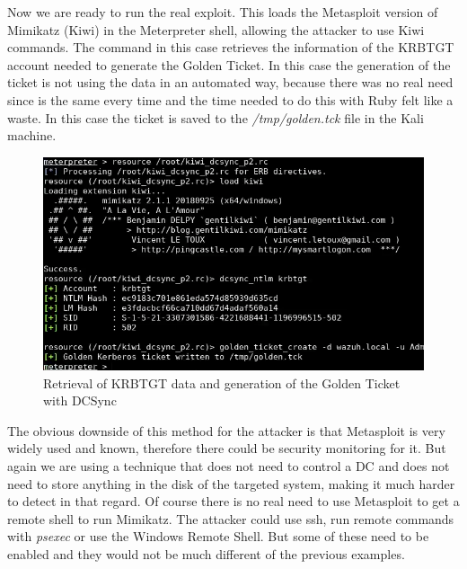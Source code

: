 Now we are ready to run the real exploit. This loads the Metasploit version of Mimikatz (Kiwi) in the Meterpreter shell, allowing the attacker to use Kiwi commands.
The command in this case retrieves the information of the KRBTGT account needed to generate the Golden Ticket.
\linej
In this case the generation of the ticket is not using the data in an automated way, because there was no real need since is the same every time and the time needed to do this with Ruby felt like a waste. In this case the ticket is saved to the \textit{/tmp/golden.tck} file in the Kali machine.
\linej

\begin{figure}[H]
	\centering
	\includegraphics[width=\textwidth]{figuras/kiwi_p2.png}
	\caption{Retrieval of KRBTGT data and generation of the Golden Ticket with DCSync}
\end{figure}
The obvious downside of this method for the attacker is that Metasploit is very widely used and known, therefore there could be security monitoring for it\cite{detect_metasploit_traffic}. But again we are using a technique that does not need to control a DC and does not need to store anything in the disk of the targeted system, making it much harder to detect in that regard.
\linej
\linej
Of course there is no real need to use Metasploit to get a remote shell to run Mimikatz. The attacker could use ssh, run remote commands with \textit{psexec} or use the Windows Remote Shell. But some of these need to be enabled and they would not be much different of the previous examples.

